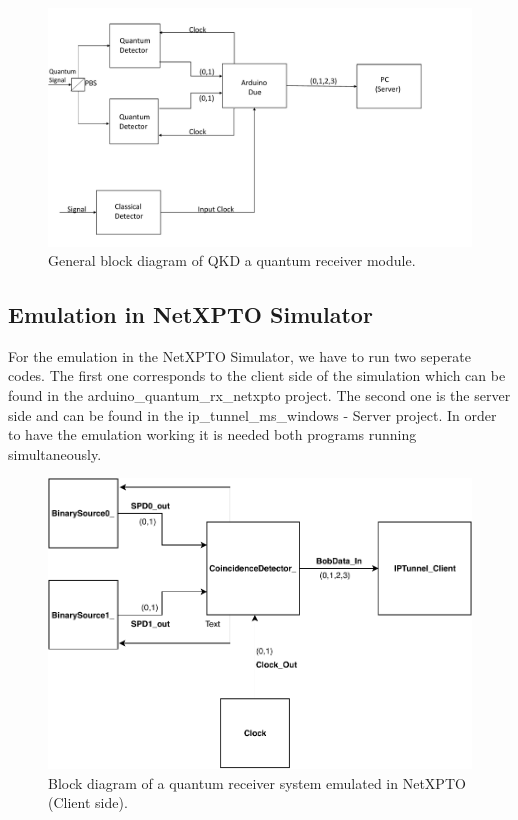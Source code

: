 \begin{refsection}
	\begin{figure}[H]
		\centering
		\includegraphics[width=1\linewidth]{./sdf/arduino_quantum_rx/figures/DiagramaGeral.pdf}
		\caption{General block diagram of QKD a quantum receiver module.}
		\label{fig:arduino}
	\end{figure}


		
	\subsection{Emulation in NetXPTO Simulator}
	
	For the emulation in the NetXPTO Simulator, we have to run two seperate codes. The first one corresponds to the client side of the simulation which can be found in the arduino\_quantum\_rx\_netxpto project. The second one is the server side and can be found in the ip\_tunnel\_ms\_windows - Server project. In order to have the emulation working it is needed both programs running simultaneously.
	
	\begin{figure}[H]
		\centering
		\includegraphics[width=0.9\linewidth]{./sdf/arduino_quantum_rx/figures/NetXPTO_implementation.pdf}
		\caption{Block diagram of a quantum receiver system emulated in NetXPTO (Client side).}
		\label{fig:netxpto}
	\end{figure}


\end{refsection}
